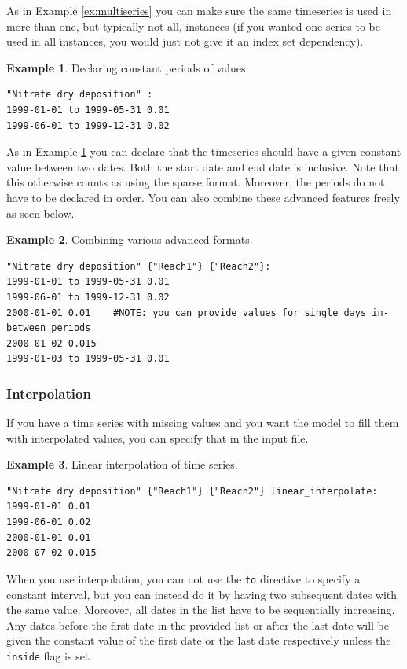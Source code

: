 \documentclass[11pt]{article}
\theoremstyle{definition}
\newtheorem{myexample}{Example}
\newenvironment{example}%
  {\begin{lrbox}{\examplebox}%
   \begin{minipage}{\dimexpr\linewidth-2\fboxsep}
   \begin{myexample}}%
  {\end{myexample}%
   \end{minipage}%
   \end{lrbox}%
   \begin{trivlist}
     \item[]\colorbox{silver}{\usebox\examplebox}
   \end{trivlist}}
\begin{document}
As in Example \ref{ex:multiseries} you can make sure the same timeseries is used in more than one, but typically not all, instances (if you wanted one series to be used in all instances, you would just not give it an index set dependency).

\begin{example}\label{ex:constantperiods}
Declaring constant periods of values
\begin{lstlisting}
"Nitrate dry deposition" :
1999-01-01 to 1999-05-31 0.01
1999-06-01 to 1999-12-31 0.02
\end{lstlisting}
\end{example}

As in Example \ref{ex:constantperiods} you can declare that the timeseries should have a given constant value between two dates. Both the start date and end date is inclusive. Note that this otherwise counts as using the sparse format. Moreover, the periods do not have to be declared in order. You can also combine these advanced features freely as seen below.

\begin{example}
Combining various advanced formats.
\begin{lstlisting}
"Nitrate dry deposition" {"Reach1"} {"Reach2"}:
1999-01-01 to 1999-05-31 0.01
1999-06-01 to 1999-12-31 0.02
2000-01-01 0.01    #NOTE: you can provide values for single days in-between periods
2000-01-02 0.015
1999-01-03 to 1999-05-31 0.01
\end{lstlisting}
\end{example}

\subsubsection{Interpolation}\label{sec:dat-interpolate}

If you have a time series with missing values and you want the model to fill them with interpolated values, you can specify that in the input file.

\begin{example}
Linear interpolation of time series.
\begin{lstlisting}
"Nitrate dry deposition" {"Reach1"} {"Reach2"} linear_interpolate:
1999-01-01 0.01
1999-06-01 0.02
2000-01-01 0.01   
2000-07-02 0.015
\end{lstlisting}
\end{example}

When you use interpolation, you can not use the {\tt to} directive to specify a constant interval, but you can instead do it by having two subsequent dates with the same value. Moreover, all dates in the list have to be sequentially increasing. Any dates before the first date in the provided list or after the last date will be given the constant value of the first date or the last date respectively unless the {\tt inside} flag is set.
\end{document}
